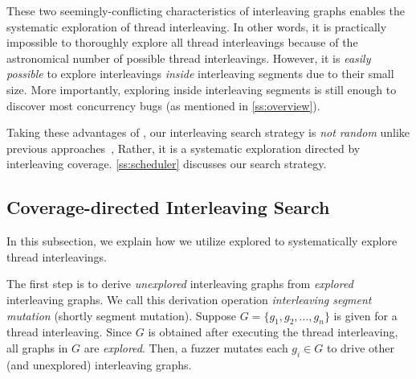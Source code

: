 These two seemingly-conflicting characteristics of interleaving graphs
enables the systematic exploration of thread interleaving.
%
In other words, it is practically impossible to thoroughly explore all
thread interleavings because of the astronomical number of possible
thread interleavings.
%
However, it is \textit{easily possible} to explore interleavings
\textit{inside} interleaving segments due to their small size. More
importantly, exploring inside interleaving segments is still enough to
discover most concurrency bugs (as mentioned in
\autoref{ss:overview}).

Taking these advantages of \intcov, our interleaving search strategy
is \textit{not random} unlike previous approaches~\cite{krace, ski,
  pctalgorithm, muzz}, Rather, it is a systematic exploration directed
by interleaving coverage.
%
\autoref{ss:scheduler} discusses our search strategy.





\subsection{Coverage-directed Interleaving Search}
\label{ss:scheduler}
%
In this subsection, we explain how we utilize explored \intcov to
systematically explore thread interleavings.

%
The first step is to derive \textit{unexplored} interleaving graphs
from \textit{explored} interleaving graphs. We call this derivation
operation \textit{interleaving segment mutation} (shortly segment
mutation).
%
Suppose $G = \{g_1, g_2, ..., g_n \}$ is given for a thread
interleaving. Since $G$ is obtained after executing the thread
interleaving, all graphs in $G$ are \textit{explored}.
%
Then, a fuzzer mutates each $g_i \in G$ to drive other (and
unexplored) interleaving graphs.



